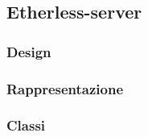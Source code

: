 \subsection{Etherless-server}
\subsubsection{Design}
\subsubsection{Rappresentazione}
\subsubsection{Classi}

